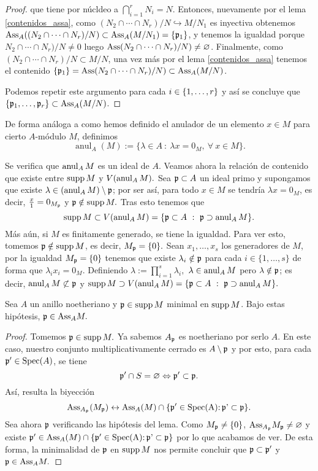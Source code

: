 \documentclass[../main.tex]{subfiles}
\begin{document}
\begin{proof}
que tiene por núcldeo a $\bigcap_{i=1}^r N_i = N$. Entonces, nuevamente por el lema \ref{contenidos_assa}, como $(N_2\cap\cdots\cap N_r)/N\hookrightarrow M/{N_1}$ es inyectiva obtenemos $\text{Ass}_A((N_2\cap\cdots\cap N_r)/N) \subset \text{Ass}_A(M/N_1) = \{\mathfrak{p}_1\}$, y tenemos la igualdad porque $N_2\cap\cdots\cap N_r)/N \neq 0$ luego $\text{Ass}(N_2\cap\cdots\cap N_r)/N) \neq \varnothing$.
Finalmente, como $(N_2\cap\cdots\cap N_r)/N \subset M/N$, una vez más por el lema \ref{contenidos_assa} tenemos el contenido  $\{\mathfrak{p}_1\}= \text{Ass}(N_2\cap\cdots\cap N_r)/N) \subset\text{Ass}_A(M/N)$.

Podemos repetir este argumento para cada $i\in\{1,\dots,r\}$ y así se concluye que $\{\mathfrak{p}_1,\dots,\mathfrak{p}_r\}\subset\text{Ass}_A(M/N)$.
\end{proof}

\begin{definition}
    De forma análoga a como hemos definido el anulador de un elemento $x\in M$ para cierto $A$-módulo $M$, definimos
    $$\operatorname{anul}_A(M):=\{\lambda\in A\ :\ \lambda x=0_M,\ \forall\ x\in M\}.$$
\end{definition}

Se verifica que $\operatorname{anul}_A M$ es un ideal de $A$. Veamos ahora la relación de contenido que existe entre $\operatorname{supp} M$ y $V(\operatorname{anul}_A M).$ Sea $\mathfrak{p}\subset A$ un ideal primo y supongamos que existe $\lambda\in(\operatorname{anul}_A M)\setminus\mathfrak{p}$; por ser así, para todo $x\in M$ se tendría $\lambda x=0_M$, es decir, $\frac{x}{1}=0_{M_{\mathfrak{p}}}$ y $\mathfrak{p}\notin\operatorname{supp} M.$ Tras esto tenemos que
$$\operatorname{supp} M\subset V(\operatorname{anul}_A M)=\{\mathfrak{p}\subset A\ :\ \mathfrak{p}\supset\operatorname{anul}_A M\}.$$
Más aún, si $M$ es finitamente generado, se tiene la igualdad. Para ver esto, tomemos $\mathfrak{p}\notin\operatorname{supp} M$, es decir, $M_{\mathfrak{p}}=\{0\}.$ Sean $x_1,\dots,x_s$ los generadores de $M$, por la igualdad $M_{\mathfrak{p}}=\{0\}$ tenemos que existe $\lambda_i\notin\mathfrak{p}$ para cada $i\in\{1,\dots,s\}$ de forma que $\lambda_i x_i=0_M.$ Definiendo $\lambda:=\prod_{i=1}^s\lambda_i,$ $\lambda\in\operatorname{anul}_A M$ pero $\lambda\notin\mathfrak{p}$; es decir, $\operatorname{anul}_A M\not\subset\mathfrak{p}$ y $\supp M\supset V(\anul_A M)=\{\p\subset A\ :\ \p\supset\anul_A M\}.$

\begin{lemma}
Sea $A$ un anillo noetheriano y $\mathfrak{p}\in\operatorname{supp} M$ minimal en $\operatorname{supp} M$. Bajo estas hipótesis, $\mathfrak{p}\in\text{Ass}_A M.$
\end{lemma}
\begin{proof}
Tomemos $\mathfrak{p}\in\operatorname{supp} M.$ Ya sabemos $A_{\mathfrak{p}}$ es noetheriano por serlo $A.$ En este caso, nuestro conjunto multiplicativamente cerrado es $A\setminus\mathfrak{p}$ y por esto, para cada $\mathfrak{p}'\in\text{Spec}(A)$, se tiene
$$\mathfrak{p}'\cap S=\varnothing\Leftrightarrow \mathfrak{p}'\subset\mathfrak{p}.$$
Así, resulta la biyección
$$\text{Ass}_{A_{\mathfrak{p}}}(M_{\mathfrak{p}})\leftrightarrow\text{Ass}_A(M)\cap\{\mathfrak{p}'\in\operatorname{Spec(A):\mathfrak{p}'\subset\mathfrak{p}}\}.$$
Sea ahora $\mathfrak{p}$ verificando las hipótesis del lema.  Como $M_{\mathfrak{p}}\neq\{0\}$, $\text{Ass}_{A_{\mathfrak{p}}} M_{\mathfrak{p}}\neq\varnothing$ y existe $\mathfrak{p}'\in \text{Ass}_A(M)\cap\{\mathfrak{p}'\in\operatorname{Spec(A):\mathfrak{p}'\subset\mathfrak{p}}\}$ por lo que acabamos de ver. De esta forma, la minimalidad de $\mathfrak{p}$ en $\operatorname{supp} M$ nos permite concluir que $\mathfrak{p}\subset\mathfrak{p}'$ y $\mathfrak{p}\in \text{Ass}_A M.$
\end{proof}
\end{document}
